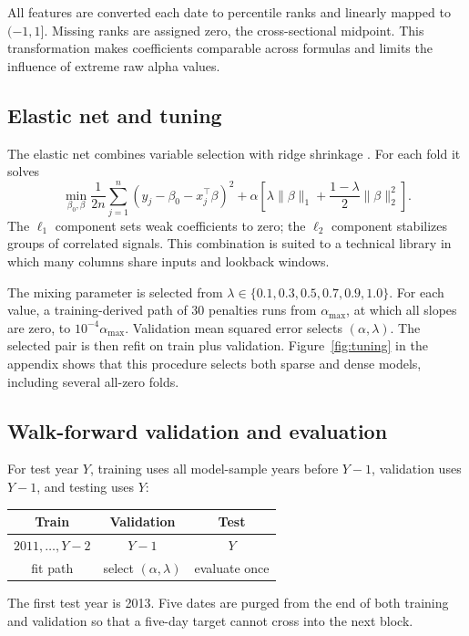 \documentclass[11pt]{article}
\begin{document}
All features are converted each date to percentile ranks and linearly mapped
to $(-1,1]$. Missing ranks are assigned zero, the cross-sectional midpoint.
This transformation makes coefficients comparable across formulas and limits
the influence of extreme raw alpha values.

\subsection{Elastic net and tuning}

The elastic net combines variable selection with ridge shrinkage
\cite{zouhastie}. For each fold it solves
\begin{equation}
 \min_{\beta_0,\beta}
 \frac{1}{2n}\sum_{j=1}^{n}
 \left(y_j-\beta_0-x_j^\top\beta\right)^2
 +\alpha\left[
 \lambda\|\beta\|_1+\frac{1-\lambda}{2}\|\beta\|_2^2
 \right].
 \label{eq:enet}
\end{equation}
The $\ell_1$ component sets weak coefficients to zero; the $\ell_2$
component stabilizes groups of correlated signals. This combination is
suited to a technical library in which many columns share inputs and
lookback windows.

The mixing parameter is selected from
$\lambda\in\{0.1,0.3,0.5,0.7,0.9,1.0\}$. For each value, a
training-derived path of 30 penalties runs from $\alpha_{\max}$, at which all
slopes are zero, to $10^{-4}\alpha_{\max}$. Validation mean squared error
selects $(\alpha,\lambda)$. The selected pair is then refit on train plus
validation. Figure~\ref{fig:tuning} in the appendix shows that this procedure
selects both sparse and dense models, including several all-zero folds.

\subsection{Walk-forward validation and evaluation}

For test year $Y$, training uses all model-sample years before $Y-1$,
validation uses $Y-1$, and testing uses $Y$:
\begin{center}
\small
\begin{tabular}{ccc}
\toprule
Train & Validation & Test \\
\midrule
$2011,\ldots,Y-2$ & $Y-1$ & $Y$ \\
fit path & select $(\alpha,\lambda)$ & evaluate once \\
\bottomrule
\end{tabular}
\end{center}
The first test year is 2013. Five dates are purged from the end of both
training and validation so that a five-day target cannot cross into the next
block.
\end{document}
